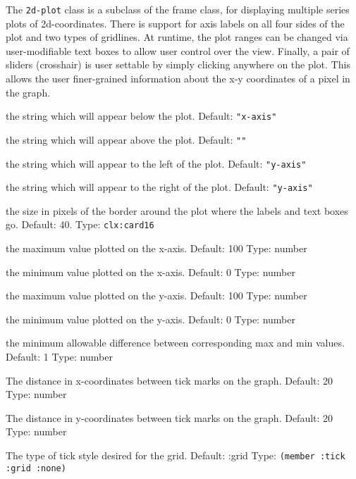 \documentclass[twoside,openright,11pt]{report}
\newcommand{\tp}[1]{\texttt{#1}}
\begin{document}
The \tp{2d-plot} class is a subclass of the frame class, for
displaying multiple series plots of 2d-coordinates.  There is support
for axis labels on all four sides of the plot and two types of
gridlines.  At runtime, the plot ranges can be changed via
user-modifiable text boxes to allow user control over the view.
Finally, a pair of sliders (crosshair) is user settable by simply
clicking anywhere on the plot.  This allows the user finer-grained
information about the x-y coordinates of a pixel in the graph.


{the string which will appear below the plot.  Default:
\tp{"x-axis"}}

{the string which will appear above the plot.  Default: \tp{""}}

{the string which will appear to the left of the plot.  Default:
\tp{"y-axis"}}

{the string which will appear to the right of the plot.  Default:
\tp{"y-axis"}}

{the size in pixels of the border around the plot where the labels and
text boxes go.  Default: 40. Type: \tp{clx:card16}}

{the maximum value plotted on the x-axis.  Default: 100  Type: number}

{the minimum value plotted on the x-axis.  Default: 0  Type: number}

{the maximum value plotted on the y-axis.  Default: 100  Type: number}

{the minimum value plotted on the y-axis.  Default: 0  Type: number}

{the minimum allowable difference between corresponding max and
min values.  Default: 1  Type: number}

{The distance in x-coordinates between tick marks on the graph.  
Default: 20  Type: number}

{The distance in y-coordinates between tick marks on the graph.  
Default: 20  Type: number}

{The type of tick style desired for the grid. Default: :grid
Type: \tp{(member :tick :grid :none)}}
\end{document}
